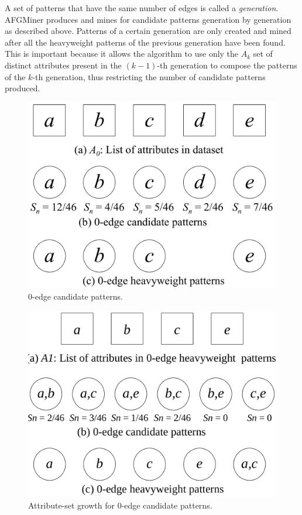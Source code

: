 A set of patterns that have the same number of edges is called a \emph{generation}. AFGMiner produces and mines for candidate patterns generation by generation as described above. Patterns of a certain generation are only created and mined after all the heavyweight patterns of the previous generation have been found. This is important because it allows the algorithm to use only the $A_k$ set of distinct attributes present in the $(k - 1)$-th generation to compose the patterns of the $k$-th generation, thus restricting the number of candidate patterns produced.

\begin{figure}[h!]
\centering
    \includegraphics[scale=0.15]{figures/example_0-edge.pdf}
    \caption{0-edge candidate patterns.}
    \label{fig:example_0-edge}  
\end{figure}

\begin{figure}[h!]
\centering
    \includegraphics[scale=0.15]{figures/example_0-edge_2-attribute.pdf}
    \caption{Attribute-set growth for 0-edge candidate patterns.}
    \label{fig:example_0-edge_2-attribute}  
\end{figure}

